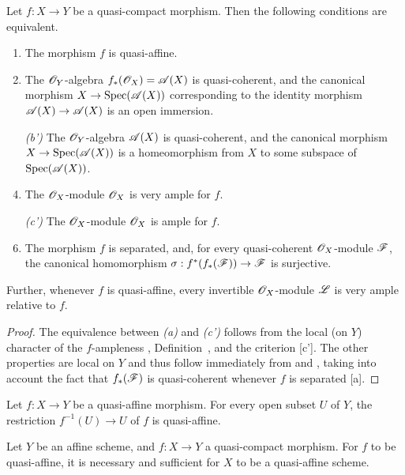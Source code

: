 \begin{prop}[5.1.6]
\label{2.5.1.6}
Let $f:X\to Y$ be a quasi-compact morphism.
Then the following conditions are equivalent.
\begin{enumerate}[label=\emph{(\alph*)}]
    \item The morphism $f$ is quasi-affine.
    \item The $\mathscr{O}_Y$-algebra $f_*(\mathscr{O}_X)=\mathscr{A}(X)$ is quasi-coherent, and the canonical morphism $X\to\Spec(\sh{A}(X))$ corresponding to the identity morphism $\sh{A}(X)\to\sh{A}(X)$  is an open immersion.
    \item[\emph{(b')}] The $\mathscr{O}_Y$-algebra $\mathscr{A}(X)$ is quasi-coherent, and the canonical morphism $X\to\Spec(\sh{A}(X))$ is a homeomorphism from $X$ to some subspace of ${\mathop{\mathrm{Spec}}\nolimits}(\mathscr{A}(X))$.
    \item The $\mathscr{O}_X$-module $\mathscr{O}_X$ is very ample for $f$.
    \item[\emph{(c')}] The $\mathscr{O}_X$-module $\mathscr{O}_X$ is ample for $f$.
    \item The morphism $f$ is separated, and, for every quasi-coherent $\mathscr{O}_X$-module $\mathscr{F}$, the canonical homomorphism $\sigma:f^*(f_*(\sh{F}))\to\sh{F}$  is surjective.
\end{enumerate}

Further, whenever $f$ is quasi-affine, every invertible $\mathscr{O}_X$-module $\mathscr{L}$ is very ample relative to $f$.
\end{prop}

\begin{proof}
\label{proof-2.5.1.6}
The equivalence between \emph{(a)} and \emph{(c')} follows from the local (on $Y$) character of the $f$-ampleness , Definition~, and the criterion [c'].
The other properties are local on $Y$
and thus follow immediately from  and , taking into account the fact that $f_*(\mathscr{F})$ is quasi-coherent whenever $f$ is separated [a].
\end{proof}

\begin{cor}[5.1.7]
\label{2.5.1.7}
Let $f:X\to Y$ be a quasi-affine morphism.
For every open subset $U$ of $Y$, the restriction $f^{-1}(U)\to U$ of $f$ is quasi-affine.
\end{cor}

\begin{cor}[5.1.8]
\label{2.5.1.8}
Let $Y$ be an affine scheme, and $f:X\to Y$ a quasi-compact morphism.
For $f$ to be quasi-affine, it is necessary and sufficient for $X$ to be a quasi-affine scheme.
\end{cor}

